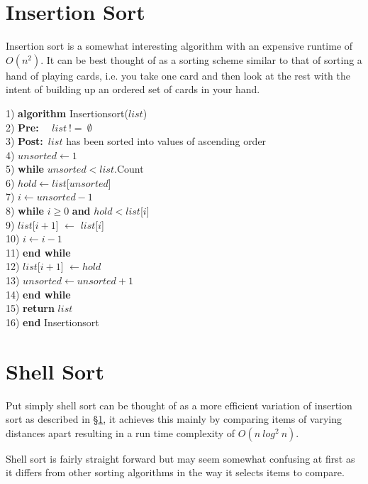 \section{Insertion Sort} \label{shell_sort}
Insertion sort is a somewhat interesting algorithm with an expensive runtime of $O(n^{2})$. It can be best thought of as a sorting scheme similar to that of sorting a hand of playing cards, i.e. you take one card and then look at the rest with the intent of building up an ordered set of cards in your hand.

\begin{tabbing}
1)  \textbf{alg}\= \textbf{orithm} Insertionsort($list$) \\
2)  \> \textbf{Pre:}~~ $list~!=~\emptyset$ \\
3)  \> \textbf{Post:}~$list$ has been sorted into values of ascending order \\
4)  \> $unsorted \leftarrow 1$ \\
5)  \> \textbf{whi}\= \textbf{le} $unsorted < list$.Count \\
6)  \> \> $hold \leftarrow list$[$unsorted$] \\
7)  \> \> $i \leftarrow unsorted - 1$ \\
8)  \> \> \textbf{whi}\= \textbf{le} $i \geq 0$ \textbf{and} $hold < list$[$i$] \\
9)  \> \> \> $list$[$i + 1$] $\leftarrow$ $list$[$i$] \\
10) \> \> \> $i \leftarrow i - 1$ \\
11) \> \> \textbf{end while} \\
12) \> \> $list$[$i+1$] $\leftarrow hold$ \\
13) \> \> $unsorted \leftarrow unsorted + 1$ \\
14) \> \textbf{end while} \\
15) \> \textbf{return} $list$ \\
16) \textbf{end} Insertionsort \\
\end{tabbing}

\newpage
\section{Shell Sort}
Put simply shell sort can be thought of as a more efficient variation of insertion sort as described in \S\ref{shell_sort}, it achieves this mainly by comparing items of varying distances apart resulting in a run time complexity of $O(n~log^{2}~n)$.

Shell sort is fairly straight forward but may seem somewhat confusing at first as it differs from other sorting algorithms in the way it selects items to compare. 

